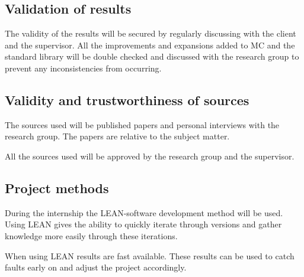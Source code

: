 \subsection{Validation of results}
The validity of the results will be secured by regularly discussing with the client and the supervisor.
All the improvements and expansions added to MC and the standard library will be double checked and discussed with the research group to prevent any inconsistencies from occurring.


\subsection{Validity and trustworthiness of sources}
The sources used will be published papers and personal interviews with the research group.
The papers are relative to the subject matter.

All the sources used will be approved by the research group and the supervisor.


\subsection{Project methods}
During the internship the LEAN-software development method will be used\cite{ries2011lean}.
Using LEAN gives the ability to quickly iterate through versions and gather knowledge more easily through these iterations.

When using LEAN results are fast available.
These results can be used to catch faults early on and adjust the project accordingly.



